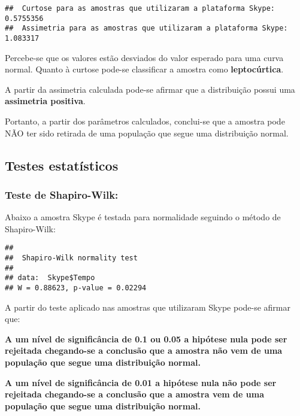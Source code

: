 \documentclass[
]{article}
\newenvironment{Shaded}{\begin{snugshade}}{\end{snugshade}}
\newcommand{\KeywordTok}[1]{\textcolor[rgb]{0.13,0.29,0.53}{\textbf{#1}}}
\newcommand{\NormalTok}[1]{#1}
\newcommand{\OperatorTok}[1]{\textcolor[rgb]{0.81,0.36,0.00}{\textbf{#1}}}
\newcommand{\StringTok}[1]{\textcolor[rgb]{0.31,0.60,0.02}{#1}}
\begin{document}
\begin{verbatim}
##  Curtose para as amostras que utilizaram a plataforma Skype:  0.5755356 
##  Assimetria para as amostras que utilizaram a plataforma Skype:  1.083317
\end{verbatim}

Percebe-se que os valores estão desviados do valor esperado para uma
curva normal. Quanto à curtose pode-se classificar a amostra como
\textbf{leptocúrtica}.

A partir da assimetria calculada pode-se afirmar que a distribuição
possui uma \textbf{assimetria positiva}.

Portanto, a partir dos parâmetros calculados, conclui-se que a amostra
pode NÃO ter sido retirada de uma população que segue uma distribuição
normal.

\hypertarget{testes-estatuxedsticos-2}{%
\subsection{Testes estatísticos}\label{testes-estatuxedsticos-2}}

\hypertarget{teste-de-shapiro-wilk-2}{%
\subsubsection{Teste de Shapiro-Wilk:}\label{teste-de-shapiro-wilk-2}}

Abaixo a amostra Skype é testada para normalidade seguindo o método de
Shapiro-Wilk:

\begin{Shaded}
\end{Shaded}

\begin{verbatim}
## 
##  Shapiro-Wilk normality test
## 
## data:  Skype$Tempo
## W = 0.88623, p-value = 0.02294
\end{verbatim}

A partir do teste aplicado nas amostras que utilizaram Skype pode-se
afirmar que:

\textbf{A um nível de significância de 0.1 ou 0.05 a hipótese nula pode
ser rejeitada chegando-se a conclusão que a amostra não vem de uma
população que segue uma distribuição normal.}

\textbf{A um nível de significância de 0.01 a hipótese nula não pode ser
rejeitada chegando-se a conclusão que a amostra vem de uma população que
segue uma distribuição normal.}
\end{document}
